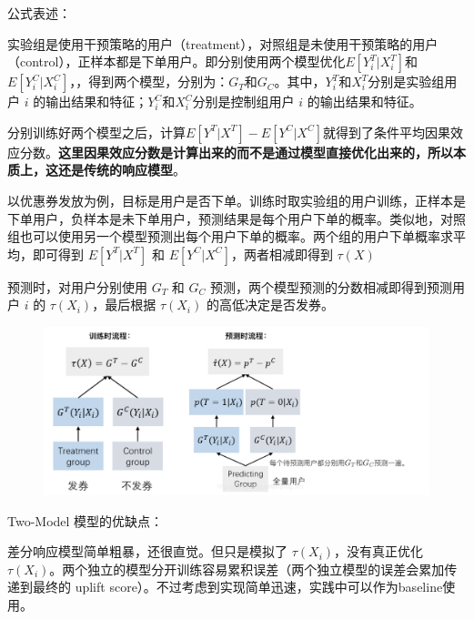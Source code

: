 \documentclass[12pt]{article}
\begin{document}
\begin{framed}
公式表述\cite{Uplift_Model_Principle_And_Practice}：

实验组是使用干预策略的用户（treatment），对照组是未使用干预策略的用户（control），正样本都是下单用户。即分别使用两个模型优化$E[Y_i^T|X_i^T]$和$E[Y_i^C|X_i^C]$，，得到两个模型，分别为：$G_T$和$G_C$。其中，$Y_i^T$和$X_i^T$分别是实验组用户 $i$ 的输出结果和特征；$Y_i^C$和$X_i^C$分别是控制组用户 $i$ 的输出结果和特征。

分别训练好两个模型之后，计算$E[Y^T|X^T] - E[Y^C|X^C]$就得到了条件平均因果效应分数。\textbf{这里因果效应分数是计算出来的而不是通过模型直接优化出来的，所以本质上，这还是传统的响应模型}。

以优惠券发放为例，目标是用户是否下单。训练时取实验组的用户训练，正样本是下单用户，负样本是未下单用户，预测结果是每个用户下单的概率。类似地，对照组也可以使用另一个模型预测出每个用户下单的概率。两个组的用户下单概率求平均，即可得到 $E[Y^T|X^T]$ 和 $E[Y^C|X^C]$，两者相减即得到 $\tau(X)$

预测时，对用户分别使用 $G_T$ 和 $G_C$ 预测，两个模型预测的分数相减即得到预测用户 $i$ 的 $\tau(X_i)$，最后根据 $\tau(X_i)$ 的高低决定是否发券。

\begin{figure}[H]
    \centering
    \includegraphics[width=1\textwidth]{fig/CasualInference-Two-Model-Train-Predict.png}
\end{figure}
\end{framed}

Two-Model 模型的优缺点：

差分响应模型简单粗暴，还很直觉。但只是模拟了 $\tau(X_i)$，没有真正优化 $\tau(X_i)$。两个独立的模型分开训练容易累积误差（两个独立模型的误差会累加传递到最终的 uplift score）。不过考虑到实现简单迅速，实践中可以作为baseline使用。
\end{document}
